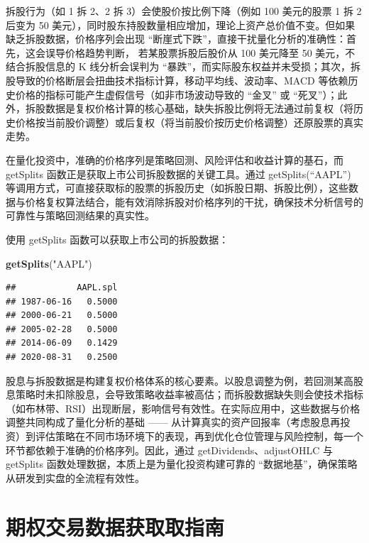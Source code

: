 \documentclass[]{ctexbook}
\newenvironment{Shaded}{\begin{snugshade}}{\end{snugshade}}
\newcommand{\FunctionTok}[1]{\textcolor[rgb]{0.13,0.29,0.53}{\textbf{#1}}}
\newcommand{\NormalTok}[1]{#1}
\newcommand{\StringTok}[1]{\textcolor[rgb]{0.31,0.60,0.02}{#1}}
\begin{document}
拆股行为（如 1 拆 2、2 拆 3）会使股价按比例下降（例如 100 美元的股票 1 拆 2 后变为 50 美元），同时股东持股数量相应增加，理论上资产总价值不变。但如果缺乏拆股数据，价格序列会出现 ``断崖式下跌''，直接干扰量化分析的准确性：首先，这会误导价格趋势判断， 若某股票拆股后股价从 100 美元降至 50 美元，不结合拆股信息的 K 线分析会误判为 ``暴跌''，而实际股东权益并未受损；其次，拆股导致的价格断层会扭曲技术指标计算，移动平均线、波动率、MACD 等依赖历史价格的指标可能产生虚假信号（如非市场波动导致的 ``金叉'' 或 ``死叉''）；此外，拆股数据是复权价格计算的核心基础，缺失拆股比例将无法通过前复权（将历史价格按当前股价调整）或后复权（将当前股价按历史价格调整）还原股票的真实走势。

在量化投资中，准确的价格序列是策略回测、风险评估和收益计算的基石，而 getSplits 函数正是获取上市公司拆股数据的关键工具。通过 getSplits(``AAPL'') 等调用方式，可直接获取标的股票的拆股历史（如拆股日期、拆股比例），这些数据与价格复权算法结合，能有效消除拆股对价格序列的干扰，确保技术分析信号的可靠性与策略回测结果的真实性。

使用 getSplits 函数可以获取上市公司的拆股数据：

\begin{Shaded}
\begin{Highlighting}[]
\FunctionTok{getSplits}\NormalTok{(}\StringTok{"AAPL"}\NormalTok{)}
\end{Highlighting}
\end{Shaded}

\begin{verbatim}
##            AAPL.spl
## 1987-06-16   0.5000
## 2000-06-21   0.5000
## 2005-02-28   0.5000
## 2014-06-09   0.1429
## 2020-08-31   0.2500
\end{verbatim}

股息与拆股数据是构建复权价格体系的核心要素。以股息调整为例，若回测某高股息策略时未扣除股息，会导致策略收益率被高估；而拆股数据缺失则会使技术指标（如布林带、RSI）出现断层，影响信号有效性。在实际应用中，这些数据与价格调整共同构成了量化分析的基础 ------ 从计算真实的资产回报率（考虑股息再投资）到评估策略在不同市场环境下的表现，再到优化仓位管理与风险控制，每一个环节都依赖于准确的价格序列。因此，通过 getDividends、adjustOHLC 与 getSplits 函数处理数据，本质上是为量化投资构建可靠的 ``数据地基''，确保策略从研发到实盘的全流程有效性。

\section{期权交易数据获取取指南}\label{ux671fux6743ux4ea4ux6613ux6570ux636eux83b7ux53d6ux53d6ux6307ux5357}
\end{document}
